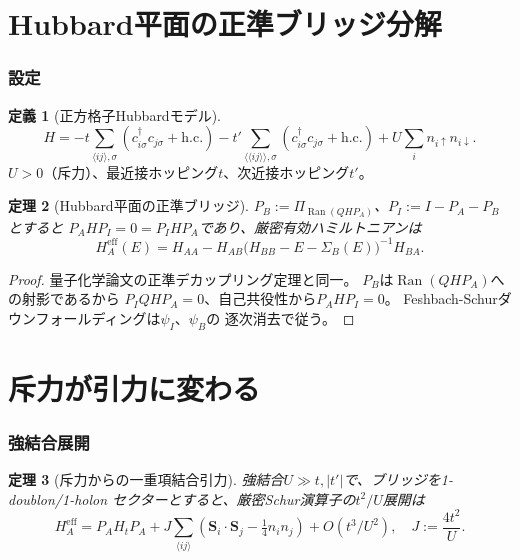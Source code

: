 \documentclass[12pt]{article}
\theoremstyle{plain}
\newtheorem{theorem}{定理}[section]
\theoremstyle{definition}
\newtheorem{definition}[theorem]{定義}
\numberwithin{equation}{section}
\newcommand{\eff}{\mathrm{eff}}
\DeclareMathOperator{\Ran}{Ran}
\begin{document}
\part{Hubbard平面の正準ブリッジ分解}

\section{設定}\label{sec:setup}

\begin{definition}[正方格子Hubbardモデル]
\begin{equation}
H = -t\sum_{\langle ij\rangle,\sigma}
(c_{i\sigma}^\dagger c_{j\sigma}+\mathrm{h.c.})
-t'\sum_{\langle\langle ij\rangle\rangle,\sigma}
(c_{i\sigma}^\dagger c_{j\sigma}+\mathrm{h.c.})
+ U\sum_i n_{i\uparrow}n_{i\downarrow}.
\end{equation}
$U>0$（斥力）、最近接ホッピング$t$、次近接ホッピング$t'$。
\end{definition}

\begin{theorem}[Hubbard平面の正準ブリッジ]\label{thm:bridge}
$P_B:=\Pi_{\Ran(QHP_A)}$、$P_I:=I-P_A-P_B$とすると
$P_AHP_I=0=P_IHP_A$であり、厳密有効ハミルトニアンは
\begin{equation}
\boxed{H_A^{\eff}(E) = H_{AA}
- H_{AB}\bigl(H_{BB}-E-\Sigma_B(E)\bigr)^{-1}H_{BA}.}
\end{equation}
\end{theorem}

\begin{proof}
量子化学論文の正準デカップリング定理と同一。
$P_B$は$\Ran(QHP_A)$への射影であるから
$P_IQHP_A=0$、自己共役性から$P_AHP_I=0$。
Feshbach-Schurダウンフォールディングは$\psi_I$、$\psi_B$の
逐次消去で従う。
\end{proof}


\part{斥力が引力に変わる}

\section{強結合展開}\label{sec:strongcoupling}

\begin{theorem}[斥力からの一重項結合引力]\label{thm:attraction}
強結合$U\gg t,|t'|$で、ブリッジを1-doublon/1-holon
セクターとすると、厳密Schur演算子の$t^2/U$展開は
\begin{equation}
H_A^{\eff} = P_A H_t P_A
+ J\sum_{\langle ij\rangle}
\left(\bm{S}_i\cdot\bm{S}_j
- \tfrac{1}{4}n_in_j\right)
+ O(t^3/U^2),
\quad J:=\frac{4t^2}{U}.
\end{equation}
\end{theorem}
\end{document}
